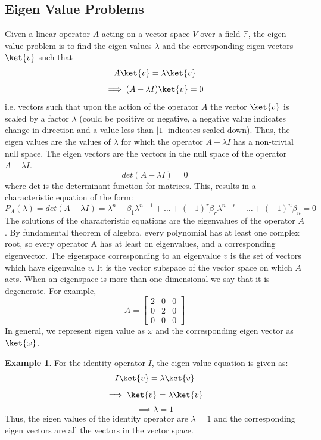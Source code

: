 \documentclass[12pt, oneside]{book}
\theoremstyle{definition}
\theoremstyle{definition}
\newtheorem{example}{Example}[section]
\theoremstyle{remark}
\begin{document}
\subsection{Eigen Value Problems}
Given a linear operator $A$ acting on a vector space $V$ over a field $\mathbb{F}$, the eigen value problem is to find the eigen values $\lambda$ and the corresponding eigen vectors $\ket{v}$ such that
\[A\ket{v}=\lambda\ket{v}\]
\[\implies (A-\lambda I)\ket{v}=0\]
i.e. vectors such that upon the action of the operator $A$ the vector $\ket{v}$ is scaled by a factor $\lambda$ (could be positive or negative, a negative value indicates change in direction and a value less than $|1|$ indicates scaled
down).
Thus, the eigen values are the values of $\lambda$ for which the operator $A-\lambda I$ has a non-trivial null space. The eigen vectors are the vectors in the null space of the operator $A-\lambda I$.
\[det(A-\lambda I)=0\]
where det is the determinant function for matrices. This, results in a characteristic equation of the form:
\[ P_A(\lambda)=det(A-\lambda I)=\lambda^n - \beta_1\lambda^{n-1} + \ldots + (-1)^{r} \beta_r\lambda^{n-r}+\ldots + (-1)^n\beta_n = 0 \]
The solutions of the characteristic equations are the eigenvalues of the operator $A$. By fundamental theorem of algebra, every polynomial has at least one complex root, so every operator A has at least on eigenvalues, and a corresponding eigenvector. The eigenspace corresponding to an eigenvalue $v$ is the set of vectors which have eigenvalue $v$. It is the vector subspace of the vector space on which $A$ acts. When an eigenspace is more than one dimensional we say that it is degenerate. For example, 
\[
A=\begin{bmatrix} 2 & 0 & 0 \\ 0& 2 & 0 \\ 0 & 0 & 0 \end{bmatrix}
\]
In general, we represent eigen value as $\omega$ and the corresponding eigen vector as $\ket{\omega}$.

\begin{example}
    For the identity operator $I$, the eigen value equation is given as:
    \[I\ket{v}=\lambda\ket{v}\]
    \[\implies \ket{v}=\lambda\ket{v}\]
    \[\implies \lambda=1\]
    Thus, the eigen values of the identity operator are $\lambda=1$ and the corresponding eigen vectors are all the vectors in the vector space.
\end{example}
\end{document}
